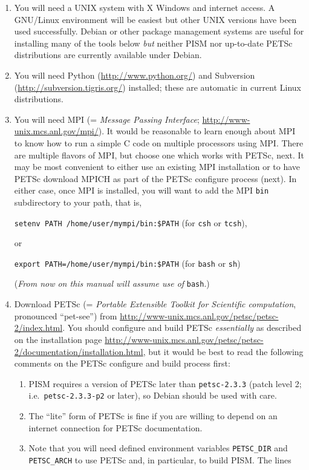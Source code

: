 \documentclass[12pt,final]{amsart}
\begin{document}
\renewcommand{\labelenumi}{\arabic{enumi}.~}
\begin{enumerate}
\item You will need a UNIX system with X Windows and internet access.  A GNU/Linux environment will be easiest but other UNIX versions have been used successfully.  Debian or other package management systems are useful for installing many of the tools below \emph{but} neither PISM nor up-to-date PETSc distributions are currently available under Debian.

\item You will need Python (\url{http://www.python.org/}) and Subversion (\url{http://subversion.tigris.org/}) installed; these are automatic in current Linux distributions.

\item You will need MPI (= \emph{Message Passing Interface}; \url{http://www-unix.mcs.anl.gov/mpi/}).  It would be reasonable to learn enough about MPI to know how to run a simple C code on multiple processors using MPI.  There are multiple flavors of MPI, but choose one which works with PETSc, next.  It may be most convenient to either use an existing MPI installation or to have PETSc download MPICH as part of the PETSc configure process (next).  In either case, once MPI is installed, you will want to add the MPI \verb|bin| subdirectory to your path, that is,

\verb|setenv PATH /home/user/mympi/bin:$PATH|  \qquad (for \verb|csh| or \verb|tcsh|),

\noindent or

\verb|export PATH=/home/user/mympi/bin:$PATH|  \qquad (for \verb|bash| or \verb|sh|)

\noindent (\emph{From now on this manual will assume use of} \verb|bash|.)
\item Download PETSc (= \emph{Portable Extensible Toolkit for Scientific computation}, pronounced ``pet-see'') from \url{http://www-unix.mcs.anl.gov/petsc/petsc-2/index.html}.  You should configure and build PETSc \emph{essentially} as described on the installation page \url{http://www-unix.mcs.anl.gov/petsc/petsc-2/documentation/installation.html}, but it would be best to read the following comments on the PETSc configure and build process first:

\renewcommand{\labelenumii}{(\roman{enumii})}\begin{enumerate}
\item PISM requires a version of PETSc later than \verb|petsc-2.3.3| (patch level 2; i.e.~\verb|petsc-2.3.3-p2| or later), so Debian should be used with care.
\item The ``lite'' form of PETSc is fine if you are willing to depend on an internet connection for PETSc documentation.
\item Note that you will need defined environment variables \verb|PETSC_DIR| and \verb|PETSC_ARCH| to use PETSc and, in particular, to build PISM.  The lines


\end{enumerate}
\end{enumerate}
\end{document}
